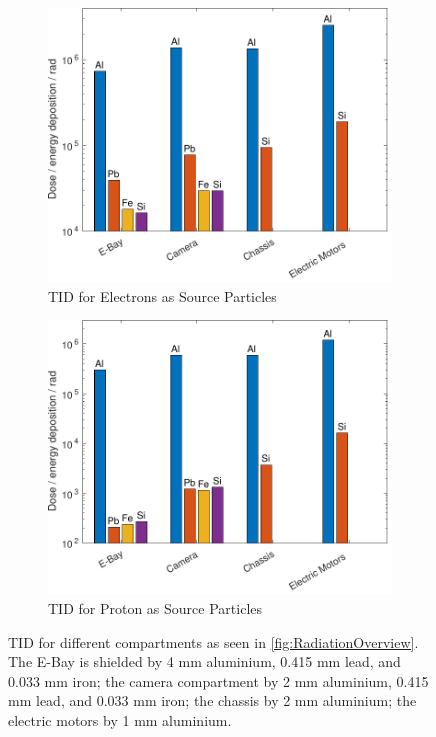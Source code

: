 \begin{figure}[htb]
     \centering
     \begin{subfigure}[b]{0.49\textwidth}
         \centering
         \includegraphics[width=\textwidth]{Media/J_Electron_Compartments}
         \caption{TID for Electrons as Source Particles}
         \label{fig:TIDElectronShielding}
     \end{subfigure}
     \hfill
     \begin{subfigure}[b]{0.49\textwidth}
         \centering
         \includegraphics[width=\textwidth]{Media/J_Proton_Compartments}
         \caption{TID for Proton as Source Particles}
         \label{fig:TIDProtonShielding}
     \end{subfigure}
     \caption{TID for different compartments as seen in \autoref{fig:RadiationOverview}. The E-Bay is shielded by 4 mm aluminium, 0.415 mm lead, and 0.033 mm iron; the camera compartment by 2 mm aluminium, 0.415 mm lead, and 0.033 mm iron; the chassis by 2 mm aluminium; the electric motors by 1 mm aluminium.}
     \label{fig:CompartmentTID}
\end{figure}

